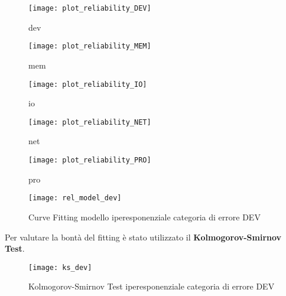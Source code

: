 \begin{minipage}{\linewidth}
  \centering
  \begin{minipage}{0.49\linewidth}
    \begin{figure}[H]
      \texttt{[image: plot\_reliability\_DEV]}
      \caption*{dev}
    \end{figure}
  \end{minipage}
  \begin{minipage}{0.49\linewidth}
    \begin{figure}[H]
      \texttt{[image: plot\_reliability\_MEM]}
      \caption*{mem}
    \end{figure}
  \end{minipage}
  \begin{minipage}{0.49\linewidth}
    \begin{figure}[H]
      \texttt{[image: plot\_reliability\_IO]}
      \caption*{io}
    \end{figure}
  \end{minipage}
  \begin{minipage}{0.49\linewidth}
    \begin{figure}[H]
      \texttt{[image: plot\_reliability\_NET]}
      \caption*{net}
    \end{figure}
  \end{minipage}
  \begin{minipage}{0.49\linewidth}
    \hspace{0.25\linewidth}
    \begin{figure}[H]
      \texttt{[image: plot\_reliability\_PRO]}
      \caption*{pro}
    \end{figure}
  \end{minipage}
\end{minipage}
\label{modello_reliability_e}

\clearpage

\begin{figure}[!htbp]
  \centering
  \texttt{[image: rel\_model\_dev]}
  \caption{Curve Fitting modello iperesponenziale categoria di errore DEV}
  \label{rel_model_dev}
\end{figure}

Per valutare la bontà del fitting è stato utilizzato il \textbf{Kolmogorov-Smirnov Test}.\\

\begin{figure}[!htbp]
  \centering
  \texttt{[image: ks\_dev]}
  \caption{Kolmogorov-Smirnov Test iperesponenziale categoria di errore DEV}
  \label{ks_dev}
\end{figure}

